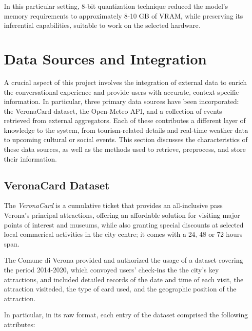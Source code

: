In this particular setting, 8-bit quantization technique reduced the model’s memory requirements to approximately 8-10 GB of VRAM, while preserving its inferential capabilities, suitable to work on the selected hardware.




\section{Data Sources and Integration}
\label{sec:data-sources}

A crucial aspect of this project involves the integration of external data to enrich the conversational experience and provide users with accurate, context-specific information. In particular, three primary data sources have been incorporated: the VeronaCard dataset, the Open-Meteo API, and a collection of events retrieved from external aggregators. Each of these contributes a different layer of knowledge to the system, from tourism-related details and real-time weather data to upcoming cultural or social events. This section discusses the characteristics of these data sources, as well as the methods used to retrieve, preprocess, and store their information.


\subsection{VeronaCard Dataset}
\label{sec:veronacard}

The \textit{VeronaCard} is a cumulative ticket that provides an all-inclusive pass Verona's principal attractions, offering an affordable solution for visiting major points of interest and museums, while also granting special discounts at selected local commerical activities in the city centre; it comes with a 24, 48 or 72 hours span.

The Comune di Verona provided and authorized the usage of a dataset covering the period 2014-2020, which convoyed users' check-ins the the city's key attractions, and included detailed records of the date and time of each visit, the attraction visiteded, the type of card used, and the geographic position of the attraction.

In particular, in its raw format, each entry of the dataset comprised the following attributes:

